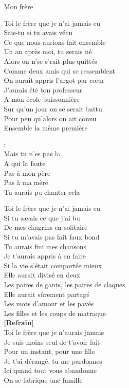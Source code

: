 \documentclass{novel}
\begin{document}
\h*{Mon frère}
\begin{multicols}{2}

Toi le frère que je n'ai jamais eu\\
Sais-tu si tu avais vécu\\
Ce que nous aurions fait ensemble\\
Un an après moi, tu serais né\\
Alors on n'se s'rait plus quittés\\
Comme deux amis qui se ressemblent\\
On aurait appris l'argot par cœur\\
J'aurais été ton professeur\\
A mon école buissonnière\\
Sur qu'un jour on se serait battu\\
Pour peu qu'alors on ait connu\\
Ensemble la même première\\

\begin{bfseries}
[Refrain]:\\
Mais tu n'es pas la\\
A qui la faute\\
Pas à mon père\\
Pas à ma mère\\
Tu aurais pu chanter cela\\
\end{bfseries}

\columnbreak
Toi le frère que je n'ai jamais eu\\
Si tu savais ce que j'ai bu\\
De mes chagrins en solitaire\\
Si tu m'avais pas fait faux bond\\
Tu aurais fini mes chansons\\
Je t'aurais appris à en faire\\
Si la vie s'était comportée mieux\\
Elle aurait divisé en deux\\
Les paires de gants, les paires de claques\\
Elle aurait sûrement partagé\\
Les mots d'amour et les pavés\\
Les filles et les coups de matraque\\

\textbf{[Refrain]}\\

Toi le frère que je n'aurais jamais\\
Je suis moins seul de t'avoir fait\\
Pour un instant, pour une fille\\
Je t'ai dérangé, tu me pardonnes\\
Ici quand tout vous abandonne\\
On se fabrique une famille\\
\end{multicols}
\end{document}
